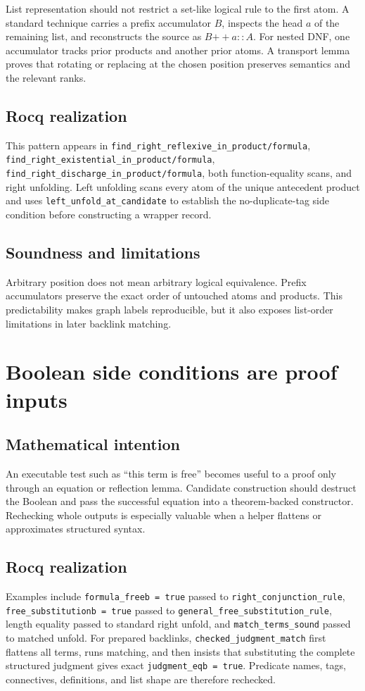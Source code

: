 \documentclass[11pt,oneside]{book}
\DeclareRobustCommand{\code}[1]{\nolinkurl{#1}}
\newcommand{\mathintent}{\subsection*{Mathematical intention}}
\newcommand{\rocqreal}{\subsection*{Rocq realization}}
\newcommand{\soundlim}{\subsection*{Soundness and limitations}}
\begin{document}
List representation should not restrict a set-like logical rule to the first
atom.  A standard technique carries a prefix accumulator \(B\), inspects the
head \(a\) of the remaining list, and reconstructs the source as
\(B\mathbin{++}a::A\).  For nested DNF, one accumulator tracks prior products
and another prior atoms.  A transport lemma proves that rotating or replacing
at the chosen position preserves semantics and the relevant ranks.

\rocqreal

This pattern appears in \code{find_right_reflexive_in_product/formula},
\code{find_right_existential_in_product/formula},
\code{find_right_discharge_in_product/formula}, both function-equality scans,
and right unfolding.  Left unfolding scans every atom of the unique
antecedent product and uses \code{left_unfold_at_candidate} to establish the
no-duplicate-tag side condition before constructing a wrapper record.

\soundlim

Arbitrary position does not mean arbitrary logical equivalence.  Prefix
accumulators preserve the exact order of untouched atoms and products.  This
predictability makes graph labels reproducible, but it also exposes list-order
limitations in later backlink matching.

\section{Boolean side conditions are proof inputs}

\mathintent

An executable test such as ``this term is free'' becomes useful to a proof only
through an equation or reflection lemma.  Candidate construction should
destruct the Boolean and pass the successful equation into a theorem-backed
constructor.  Rechecking whole outputs is especially valuable when a helper
flattens or approximates structured syntax.

\rocqreal

Examples include \code{formula_freeb = true} passed to
\code{right_conjunction_rule}, \code{free_substitutionb = true} passed to
\code{general_free_substitution_rule}, length equality passed to standard
right unfold, and \code{match_terms_sound} passed to matched unfold.  For
prepared backlinks, \code{checked_judgment_match} first flattens all terms,
runs matching, and then insists that substituting the complete structured
judgment gives exact \code{judgment_eqb = true}.  Predicate names, tags,
connectives, definitions, and list shape are therefore rechecked.
\end{document}
